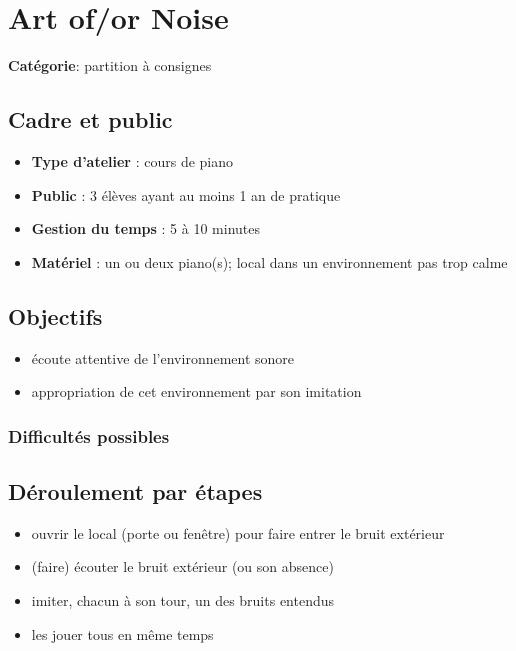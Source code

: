 \documentclass[a4paper,11pt,bibliography=totoc,numbers=noenddot,listof=flat,DIV=11,BCOR=0mm]{scrreprt}%
\begin{document}
\chapter[Partition à consigne: Art of/or Noise]{Art of/or Noise}

{\large \textbf{Catégorie}}:
partition à consignes


\section*{Cadre et public}
\begin{itemize}
\item [\textbullet]\textbf{Type d'atelier} : cours de piano

\item [\textbullet]\textbf{Public} : 3 élèves ayant au moins 1 an de pratique

\item [\textbullet]\textbf{Gestion du temps} : 5 à 10 minutes

\item [\textbullet]\textbf{Matériel} : un ou deux piano(s); local dans un environnement pas trop calme
\end{itemize}

\section*{Objectifs}
\begin{itemize}
\item écoute attentive de l'environnement sonore
\item appropriation de cet environnement par son imitation
\end{itemize}

\subsection*{Difficultés possibles}

\section*{Déroulement par étapes}
\begin{itemize}
\item ouvrir le local (porte ou fenêtre) pour faire entrer le bruit extérieur
\item (faire) écouter le bruit extérieur (ou son absence)
\item imiter, chacun à son tour, un des bruits entendus
\item les jouer tous en même temps



\end{itemize}
\end{document}
